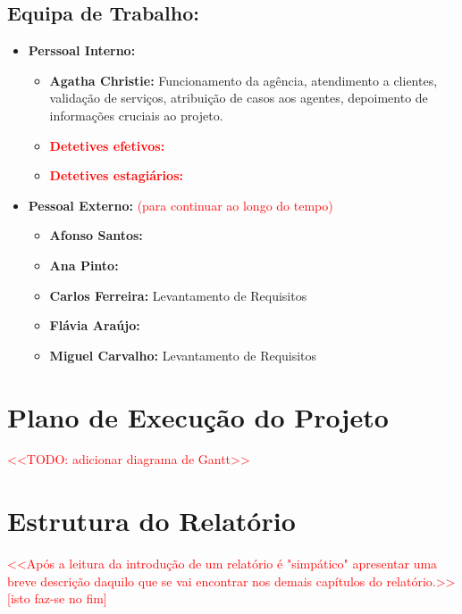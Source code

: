 \documentclass[a4paper,12pt]{scrreprt}
\begin{document}
        \subsection{Equipa de Trabalho:}
            \begin{itemize}
                \item \textbf{Perssoal Interno:}
                \begin{itemize}
                    \item \textbf{Agatha Christie:} Funcionamento da agência, atendimento a clientes,
                        validação de serviços, atribuição de casos aos agentes, depoimento de informações
                        cruciais ao projeto.
                    \item \textcolor{red}{\textbf{Detetives efetivos:}}
                    \item \textcolor{red}{\textbf{Detetives estagiários:}}
                \end{itemize}
            \item \textbf{Pessoal Externo:} \textcolor{red}{(para continuar ao longo do tempo)}
                \begin{itemize}
                    \item \textbf{Afonso Santos:}
                    \item \textbf{Ana Pinto:}
                    \item \textbf{Carlos Ferreira:} Levantamento de Requisitos
                    \item \textbf{Flávia Araújo:}
                    \item \textbf{Miguel Carvalho:} Levantamento de Requisitos
                \end{itemize}
            \end{itemize}

    \section{Plano de Execução do Projeto}
        \textcolor{red}{
            <<TODO: adicionar diagrama de Gantt>>
        }
    \section{Estrutura do Relatório}
        \textcolor{red}{
            <<Após a leitura da introdução de um relatório é "simpático" apresentar uma breve descrição daquilo que se vai encontrar nos demais capítulos do relatório.>>
        } \\
        \textcolor{red}{[isto faz-se no fim]}
\end{document}
